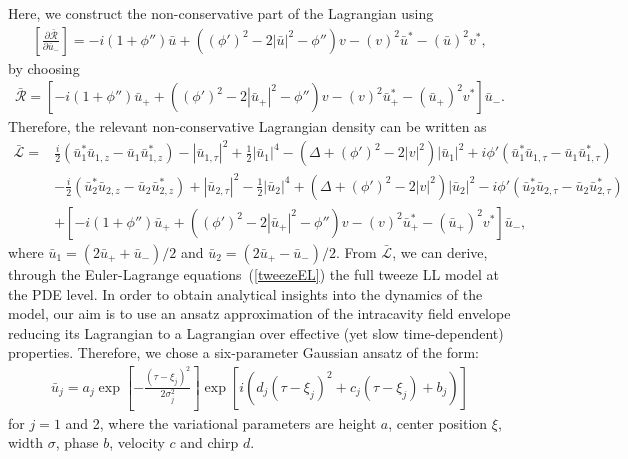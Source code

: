 Here, we construct the non-conservative part of the Lagrangian using 
\begin{align}
\left [ \frac{\partial \bar{\mathcal{R}}}{\partial \bar{u}_-} \right ] = - i (1+\phi'') \bar{u} + \left((\phi')^2  - 2 |\bar{u}|^2- \phi''\right) v -  (v)^2 \bar{u}^* - (\bar{u})^2 v^*,
\end{align}
by choosing 
\begin{align}
\bar{\mathcal{R}} = \left [ - i (1+\phi'') \bar{u}_+ + \left((\phi')^2  - 2 |\bar{u}_+|^2- \phi''\right) v -  (v)^2 \bar{u}_+^* - (\bar{u}_+)^2 v^* \right ]  \bar{u}_-.
\end{align}
Therefore, the relevant non-conservative Lagrangian density can be written as 
\begin{align}
\bar{\mathcal{L}} =&  \frac{i}{2} \left(\bar{u}_1^* \bar{u}_{1,z} - \bar{u}_1\bar{u}_{1,z}^* \right) - |\bar{u}_{1,\tau}|^2 + \frac{1}{2} |\bar{u}_1|^4 -\left( \Delta +  (\phi')^2 -2|v|^2 \right) |\bar{u}_1|^2 + i\phi' \left(\bar{u}_1^* \bar{u}_{1,\tau} - \bar{u}_1\bar{u}_{1,\tau}^*  \right) \nonumber \\
& - \frac{i}{2} \left(\bar{u}_2^* \bar{u}_{2,z} - \bar{u}_2\bar{u}_{2,z}^* \right) + |\bar{u}_{2,\tau}|^2 - \frac{1}{2} |\bar{u}_2|^4 + \left( \Delta +  (\phi')^2 -2|v|^2 \right) |\bar{u}_2|^2 - i\phi' \left(\bar{u}_2^* \bar{u}_{2,\tau} - \bar{u}_2\bar{u}_{2,\tau}^*  \right) \nonumber \\
& + \left [ - i (1+\phi'') \bar{u}_+ + \left((\phi')^2  - 2 |\bar{u}_+|^2- \phi''\right) v -  (v)^2 \bar{u}_+^* - (\bar{u}_+)^2 v^* \right ]  \bar{u}_-,
\end{align}
where $\bar{u}_1 = (2\bar{u}_+ + \bar{u}_-)/2$ and $\bar{u}_2 = (2\bar{u}_+ - \bar{u}_-)/2$.  
From $\bar{\mathcal{L}}$, we can derive, through the Euler-Lagrange equations~(\ref{tweezeEL}) the full tweeze LL model at the PDE level.  In order to obtain analytical insights into the dynamics of the model, our aim is to use an ansatz approximation of the intracavity field envelope reducing its Lagrangian to a Lagrangian over effective (yet slow time-dependent) properties.  Therefore, we chose a six-parameter Gaussian ansatz of the form:
\begin{align}
\bar{u}_j = a_j \exp \left[ -\frac{(\tau - \xi_j)^2}{2\sigma_j^2} \right] \exp \left[ i (d_j (\tau - \xi_j)^2 + c_j (\tau - \xi_j) + b_j ) \right]
\label{6pAnsatzTweeze}
\end{align}
for $j=1$ and 2, where the variational parameters are height $a$, center position $\xi$, width $\sigma$, phase $b$, velocity $c$ and chirp $d$.  

